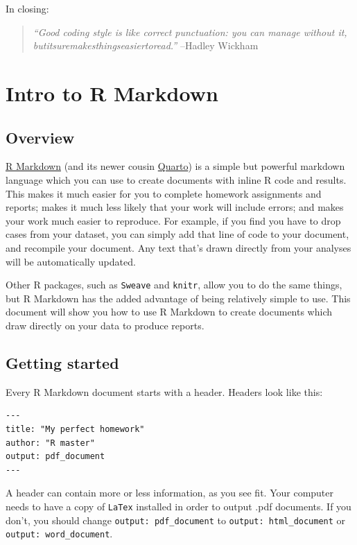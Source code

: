 \documentclass[
  letterpaper,
  DIV=11,
  numbers=noendperiod]{scrreprt}
\begin{document}
In closing:

\begin{quote}
\emph{``Good coding style is like correct punctuation: you can manage
without it, butitsuremakesthingseasiertoread.''} --Hadley Wickham
\end{quote}

\hypertarget{intro-to-r-markdown}{%
\chapter{Intro to R Markdown}\label{intro-to-r-markdown}}

\hypertarget{overview-1}{%
\section{Overview}\label{overview-1}}

\href{https://bookdown.org/yihui/rmarkdown/}{R Markdown} (and its newer
cousin \href{https://quarto.org/}{Quarto}) is a simple but powerful
markdown language which you can use to create documents with inline R
code and results. This makes it much easier for you to complete homework
assignments and reports; makes it much less likely that your work will
include errors; and makes your work much easier to reproduce. For
example, if you find you have to drop cases from your dataset, you can
simply add that line of code to your document, and recompile your
document. Any text that's drawn directly from your analyses will be
automatically updated.

Other R packages, such as \texttt{Sweave} and \texttt{knitr}, allow you
to do the same things, but R Markdown has the added advantage of being
relatively simple to use. This document will show you how to use R
Markdown to create documents which draw directly on your data to produce
reports.

\hypertarget{getting-started}{%
\section{Getting started}\label{getting-started}}

Every R Markdown document starts with a header. Headers look like this:

\begin{verbatim}
---
title: "My perfect homework"
author: "R master"
output: pdf_document
---
\end{verbatim}

A header can contain more or less information, as you see fit. Your
computer needs to have a copy of \texttt{LaTex} installed in order to
output .pdf documents. If you don't, you should change
\texttt{output:\ pdf\_document} to \texttt{output:\ html\_document} or
\texttt{output:\ word\_document}.
\end{document}
